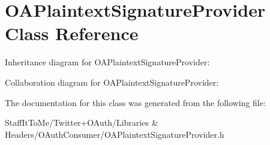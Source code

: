 \hypertarget{interface_o_a_plaintext_signature_provider}{
\section{\-O\-A\-Plaintext\-Signature\-Provider \-Class \-Reference}
\label{interface_o_a_plaintext_signature_provider}
}


\-Inheritance diagram for \-O\-A\-Plaintext\-Signature\-Provider\-:


\-Collaboration diagram for \-O\-A\-Plaintext\-Signature\-Provider\-:


\-The documentation for this class was generated from the following file\-:\begin{DoxyCompactItemize}
\item 
\-Staff\-It\-To\-Me/\-Twitter+\-O\-Auth/\-Libraries \& Headers/\-O\-Auth\-Consumer/\-O\-A\-Plaintext\-Signature\-Provider.\-h\end{DoxyCompactItemize}
